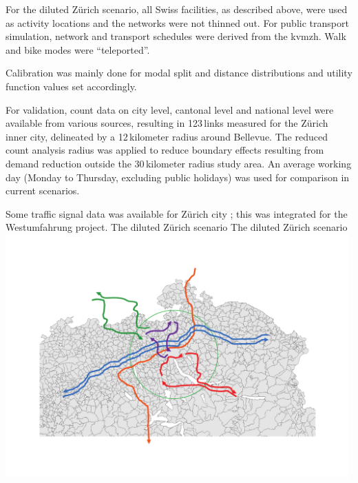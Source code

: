 For the diluted Zürich scenario, all Swiss facilities, as described above, were used as activity locations and the networks were not thinned out. For public transport simulation, network and transport schedules were derived from the \gls{kvmzh}. Walk and bike modes were ``\gls{teleported}''. 

Calibration was mainly done for modal split and distance distributions and utility function values set accordingly.

For validation, count data on city level, cantonal level and national level \citep[][]{ASTRA_Webpage_2006} were available from various sources, resulting in 123\,links measured for the Zürich inner city, delineated by a 12\,kilometer radius around Bellevue. The reduced count analysis radius was applied to reduce boundary effects resulting from demand reduction outside the 30\,kilometer radius study area. An average working day (Monday to Thursday, excluding public holidays) was used for comparison in current scenarios.

Some traffic signal data was available for Zürich city \citep[][]{STAPOZH-DAV_unpub_gtZH_2008}; this was integrated for the Westumfahrung project.
%
\createfigure%
{The diluted Zürich scenario}%
{The diluted Zürich scenario}%
{\label{fig:zurichScenario}}%
{\includegraphics[width=0.99\textwidth, angle=0]{scenarios/figures/zh.pdf}}%
{}

